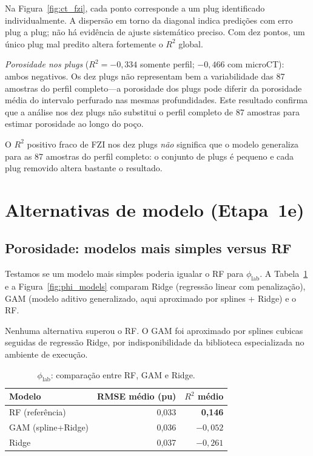 \documentclass[11pt,a4paper]{article}
\newcommand{\philab}{\ensuremath{\phi_{\mathrm{lab}}}}
\begin{document}
Na Figura~\ref{fig:ct_fzi}, cada ponto corresponde a um plug identificado
individualmente.
A dispersão em torno da diagonal indica predições com erro plug a plug;
não há evidência de ajuste sistemático preciso.
Com dez pontos, um único plug mal predito altera fortemente o $R^2$ global.

\emph{Porosidade nos plugs} ($R^2 = -0{,}334$ somente perfil; $-0{,}466$ com
microCT): ambos negativos.
Os dez plugs não representam bem a variabilidade das 87 amostras do perfil
completo---a porosidade dos plugs pode diferir da porosidade média do
intervalo perfurado nas mesmas profundidades.
Este resultado confirma que a análise nos dez plugs não substitui o
perfil completo de 87 amostras para estimar porosidade ao longo do poço.

O $R^2$ positivo fraco de FZI nos dez plugs \emph{não} significa que o
modelo generaliza para as 87 amostras do perfil completo: o conjunto de
plugs é pequeno e cada plug removido altera bastante o resultado.

\section{Alternativas de modelo (Etapa~1e)}
\label{sec:alternativas}

\subsection{Porosidade: modelos mais simples versus RF}

Testamos se um modelo mais simples poderia igualar o RF para
\philab{}.
A Tabela~\ref{tab:phi_models} e a Figura~\ref{fig:phi_models} comparam
Ridge (regressão linear com penalização), GAM (modelo aditivo
generalizado, aqui aproximado por splines + Ridge) e o RF.

Nenhuma alternativa superou o RF.
O GAM foi aproximado por splines cubicas seguidas de regressão Ridge,
por indisponibilidade da biblioteca especializada no ambiente de execução.

\begin{table}[H]
  \centering
  \caption{\philab{}: comparação entre RF, GAM e Ridge.}
  \label{tab:phi_models}
  \begin{tabular}{lrr}
    \toprule
    Modelo & RMSE médio (pu) & $R^2$ médio \\
    \midrule
    RF (referência) & 0,033 & \textbf{0,146} \\
    GAM (spline+Ridge) & 0,036 & $-0{,}052$ \\
    Ridge & 0,037 & $-0{,}261$ \\
    \bottomrule
  \end{tabular}
\end{table}
\end{document}
